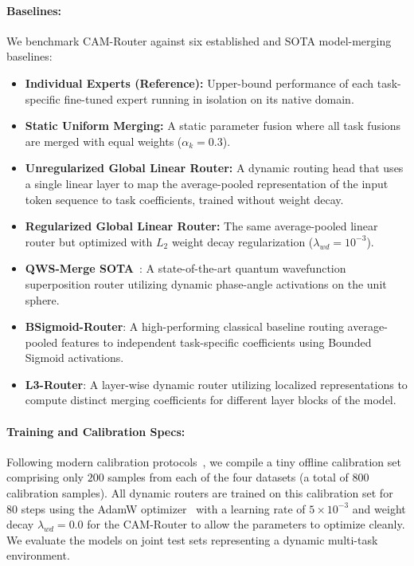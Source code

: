 \paragraph{Baselines:} We benchmark CAM-Router against six established and SOTA model-merging baselines:
\begin{itemize}
    \item \textbf{Individual Experts (Reference):} Upper-bound performance of each task-specific fine-tuned expert running in isolation on its native domain.
    \item \textbf{Static Uniform Merging:} A static parameter fusion where all task fusions are merged with equal weights ($\alpha_k = 0.3$).
    \item \textbf{Unregularized Global Linear Router:} A dynamic routing head that uses a single linear layer to map the average-pooled representation of the input token sequence to task coefficients, trained without weight decay.
    \item \textbf{Regularized Global Linear Router:} The same average-pooled linear router but optimized with $L_2$ weight decay regularization ($\lambda_{wd} = 10^{-3}$).
    \item \textbf{QWS-Merge SOTA}~\cite{qwsmerge}: A state-of-the-art quantum wavefunction superposition router utilizing dynamic phase-angle activations on the unit sphere.
    \item \textbf{BSigmoid-Router}: A high-performing classical baseline routing average-pooled features to independent task-specific coefficients using Bounded Sigmoid activations.
    \item \textbf{L3-Router}: A layer-wise dynamic router utilizing localized representations to compute distinct merging coefficients for different layer blocks of the model.
\end{itemize}

\paragraph{Training and Calibration Specs:} Following modern calibration protocols~\cite{adamerging}, we compile a tiny offline calibration set comprising only $200$ samples from each of the four datasets (a total of $800$ calibration samples). All dynamic routers are trained on this calibration set for $80$ steps using the AdamW optimizer~\cite{loshchilov2017decoupled} with a learning rate of $5 \times 10^{-3}$ and weight decay $\lambda_{wd} = 0.0$ for the CAM-Router to allow the parameters to optimize cleanly. We evaluate the models on joint test sets representing a dynamic multi-task environment.

